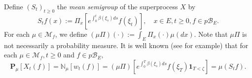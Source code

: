 \documentclass[UTF8]{pkuthss}
\theoremstyle{plain}
\theoremstyle{definition}
\numberwithin{equation}{section}
\begin{document}
	Define $(S_t)_{t \geq 0}$ the \emph{mean semigroup} of the superprocess $X$ by
\begin{equation}
\label{eq: mean semigroup}
	S_t f(x)
	:= \Pi_x[e^{\int_0^t \beta(\xi_s) ds} f(\xi_t)],
	\quad x \in E,t \geq 0,f \in p\mathscr B_E.
\end{equation}
	For each $\mu \in \mathcal M_f$, we define $ (\mu\Pi)(\cdot):= \int_E \Pi_x(\cdot)\mu(dx)$.
	Note that $\mu\Pi$ is not necessarily a probability measure.
	It is well known (see \cite[Proposition 2.27]{Li2011Measure-valued} for example) that for each $\mu \in \mathcal M_f, t \geq 0$ and $f \in p\mathscr B_E,$
\begin{equation}
\label{eq: mean formula}
	\mathbf P_\mu[X_t(f)]
	= \mathbb N_\mu[w_t(f)]
	= (\mu\Pi)[e^{\int_0^T \beta(\xi_s)ds}f(\xi_T)\mathbf 1_{T<\zeta}]
	=\mu(S_t f).
\end{equation}
\end{document}
